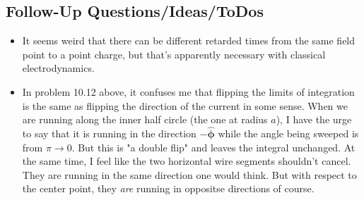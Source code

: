 \subsection*{Follow-Up Questions/Ideas/ToDos}
\begin{itemize}
    \item It seems weird that there can be different retarded times from the same field point to a point charge, but that's apparently necessary with classical electrodynamics. 
    \item In problem 10.12 above, it confuses me that flipping the limits of integration is the same as flipping the direction of the current in some sense. When we are running along the inner half circle (the one at radius \(a\)), I have the urge to say that it is running in the direction \(- \boldsymbol{\hat{\mathbf{\phi}}}\) while the angle being sweeped is from \(\pi \to 0\). But this is "a double flip" and leaves the integral unchanged. At the same time, I feel like the two horizontal wire segments shouldn't cancel. They are running in the same direction one would think. But with respect to the center point, they \textit{are} running in oppositse directions of course. 
\end{itemize}
